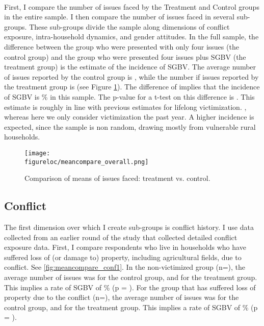 \documentclass[10pt,a4paper]{scrartcl} %
\newcommand{\figureloc}{C:/Users/Koen/Dropbox/PhD/Papers/CongoGBV/Figures}
\begin{document}
\paragraph{}
First, I compare the number of issues faced by the Treatment and Control groups in the entire sample. I then compare the number of issues faced in several sub-groups. These sub-groups divide the sample along dimensions of conflict exposure, intra-household dynamics, and gender attitudes. In the full sample, the difference between the group who were presented with only four issues (the control group) and the group who were presented four issues plus SGBV (the treatment group) is the estimate of the incidence of SGBV. The average number of issues reported by the control group is , while the number if issues reported by the treatment group is  (see Figure \ref{fig:meancompare_overall}). The difference of  implies that the incidence of SGBV is \% in this sample. The p-value for a t-test on this difference is . This estimate is roughly in line with previous estimates for lifelong victimization.
 \citep{Peterson2018,Stark2017,Johnson2010}, whereas here we only consider victimization the past year. A higher incidence is expected, since the sample is non random, drawing mostly from vulnerable rural households. 


\begin{figure}[H]
  \texttt{[image: \\figureloc/meancompare\_overall.png]}
  \caption{Comparison of means of issues faced: treatment vs. control.}
  \label{fig:meancompare_overall}
\end{figure}
\subsection*{Conflict}
The first dimension over which I create sub-groups is conflict history. I use data collected from an earlier round of the study that collected detailed conflict exposure data. First, I compare respondents who live in households who have suffered loss of (or damage to) property, including agricultural fields, due to conflict. See \ref{fig:meancompare_conf1}. In the non-victimized group (n=), the average number of issues was  for the control group, and  for the treatment group. This implies a rate of SGBV of \% (p = ). For the group that has suffered loss of property due to the conflict (n=), the average number of issues was  for the control group, and  for the treatment group. This implies a rate of SGBV of \% (p = ).
\end{document}
